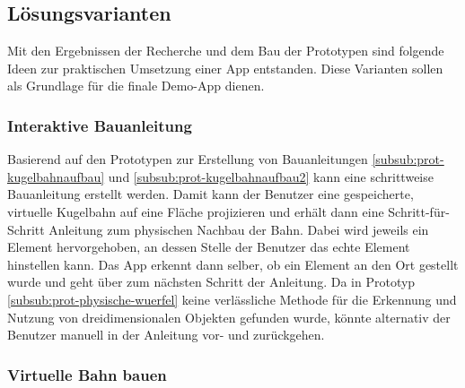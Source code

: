 







\subsection{Lösungsvarianten}\label{sub:loesungsvarianten}

Mit den Ergebnissen der Recherche und dem Bau der Prototypen sind folgende Ideen zur praktischen Umsetzung einer App entstanden.
Diese Varianten sollen als Grundlage für die finale Demo-App dienen.

\subsubsection{Interaktive Bauanleitung}\label{subsub:loesung-bauanleitung}

Basierend auf den Prototypen zur Erstellung von Bauanleitungen \ref{subsub:prot-kugelbahnaufbau} und \ref{subsub:prot-kugelbahnaufbau2} kann eine schrittweise Bauanleitung erstellt werden.
Damit kann der Benutzer eine gespeicherte, virtuelle Kugelbahn auf eine Fläche projizieren und erhält dann eine Schritt-für-Schritt Anleitung zum physischen Nachbau der Bahn.
Dabei wird jeweils ein Element hervorgehoben, an dessen Stelle der Benutzer das echte Element hinstellen kann.
Das App erkennt dann selber, ob ein Element an den Ort gestellt wurde und geht über zum nächsten Schritt der Anleitung.
Da in Prototyp \ref{subsub:prot-physische-wuerfel} keine verlässliche Methode für die Erkennung und Nutzung von dreidimensionalen Objekten gefunden wurde, könnte alternativ der Benutzer manuell in der Anleitung vor- und zurückgehen.

\subsubsection{Virtuelle Bahn bauen}\label{subsub:loesung-virtuelle-bahn}

